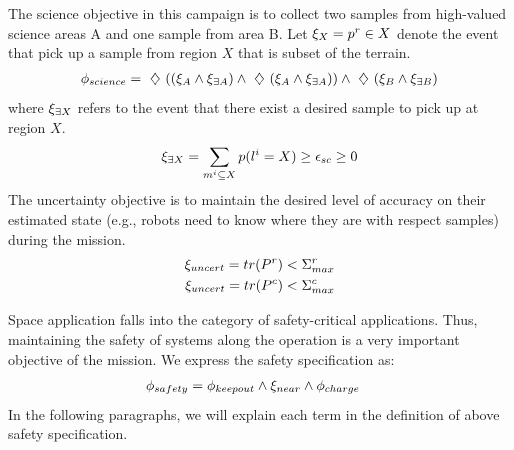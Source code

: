 \documentclass[conference]{IEEEtran}
\begin{document}
\noindent{} The science objective in this campaign is to collect two samples from high-valued science areas A and one sample from area B. Let $\xi_{X} = p^r \in X$ denote the event that pick up a sample from region $X$ that is subset of the terrain.
    \begin{align}
        \phi_{science} = \ \diamondsuit\  ((\xi_A \land \xi_{\exists A}) \land
        \ \diamondsuit\  (\xi_A \land \xi_{\exists A})) \land
        \ \diamondsuit\  (\xi_B \land \xi_{\exists B})
    \end{align}
    where $\xi_{\exists X}$ refers to the event that there exist a desired sample to pick up at region $X$.
    \begin{align}
    \xi_{\exists X} = \sum_{m^i \subseteq X} p(l^i=X) \geq \epsilon_{sc}\geq 0
    \end{align}
     The uncertainty objective is to maintain the desired level of accuracy on their estimated state (e.g., robots need to know where they are with respect samples) during the mission. 
    \begin{align}
        \nonumber\xi_{uncert} = tr(P^r) < \Sigma^r_{max}\\
        \xi_{uncert} = tr(P^c) < \Sigma^c_{max}
    \end{align}
    
   \noindent {} Space application falls into the category of safety-critical applications. Thus, maintaining the safety of systems along the operation is a very important objective of the mission. We express the safety specification as:
	\begin{align}
	   \phi_{safety} &= \phi_{keepout} \land \xi_{near} \land \phi_{charge}
	\end{align}
	In the following paragraphs, we will explain each term in the definition of above safety specification.
	
\end{document}
